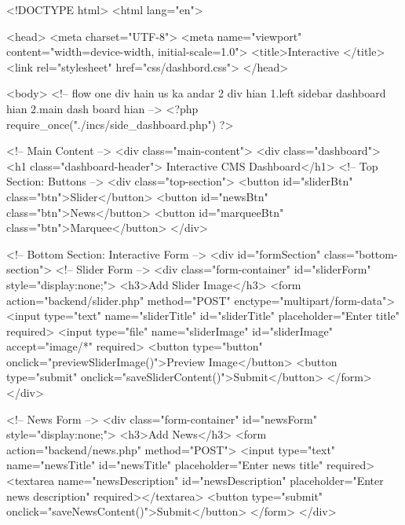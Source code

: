<!DOCTYPE html>
<html lang="en">

<head>
    <meta charset="UTF-8">
    <meta name="viewport" content="width=device-width, initial-scale=1.0">
    <title>Interactive </title>
    <link rel="stylesheet" href="css/dashbord.css">
</head>

<body>
    <!-- flow
     one div hain
     us ka andar 2 div hian 
     1.left sidebar dashboard hian
     2.main dash board hian  -->
    <?php require_once("./incs/side_dashboard.php") ?>






    <!-- Main Content -->
    <div class="main-content">
        <div class="dashboard">
            <h1 class="dashboard-header"> Interactive CMS Dashboard</h1>
            <!-- Top Section: Buttons -->
            <div class="top-section">
                <button id="sliderBtn" class="btn">Slider</button>
                <button id="newsBtn" class="btn">News</button>
                <button id="marqueeBtn" class="btn">Marquee</button>
            </div>












            <!-- Bottom Section: Interactive Form -->
            <div id="formSection" class="bottom-section">
                <!-- Slider Form -->
                <div class="form-container" id="sliderForm" style="display:none;">
                    <h3>Add Slider Image</h3>
                    <form action="backend/slider.php" method="POST" enctype="multipart/form-data">
                        <input type="text" name="sliderTitle" id="sliderTitle" placeholder="Enter title" required>
                        <input type="file" name="sliderImage" id="sliderImage" accept="image/*" required>
                        <button type="button" onclick="previewSliderImage()">Preview Image</button>
                        <button type="submit" onclick="saveSliderContent()">Submit</button>
                    </form>
                </div>

                <!-- News Form -->
                <div class="form-container" id="newsForm" style="display:none;">
                    <h3>Add News</h3>
                    <form action="backend/news.php" method="POST">
                        <input type="text" name="newsTitle" id="newsTitle" placeholder="Enter news title" required>
                        <textarea name="newsDescription" id="newsDescription" placeholder="Enter news description" required></textarea>
                        <button type="submit" onclick="saveNewsContent()">Submit</button>
                    </form>
                </div>

